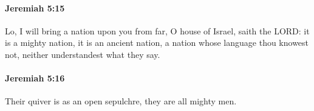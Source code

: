 		\paragraph{Jeremiah 5:15} %
			\label{JEREMIAH-5-15}

			Lo, I will bring a nation upon you from far, O house of Israel, saith the LORD: it is a mighty nation, it is an ancient nation, a nation whose language thou knowest not, neither understandest what they say.


		\paragraph{Jeremiah 5:16} %
			\label{JEREMIAH-5-16}

			Their quiver is as an open sepulchre, they are all mighty men.


